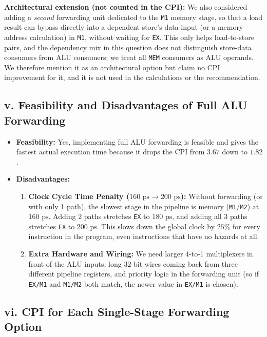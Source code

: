 \documentclass[11pt, a4paper]{article}
\begin{document}
\vspace{6pt}
\textbf{Architectural extension (not counted in the CPI):} We also considered adding a \emph{second} forwarding unit dedicated to the \texttt{M1} memory stage, so that a load result can bypass directly into a dependent store's data input (or a memory-address calculation) in \texttt{M1}, without waiting for \texttt{EX}. This only helps load-to-store pairs, and the dependency mix in this question does not distinguish store-data consumers from ALU consumers; we treat all \texttt{MEM} consumers as ALU operands. We therefore mention it as an architectural option but claim no CPI improvement for it, and it is not used in the calculations or the recommendation.

\subsection*{v. Feasibility and Disadvantages of Full ALU Forwarding}

\begin{itemize}[noitemsep, topsep=2pt]
    \item \textbf{Feasibility:} Yes, implementing full ALU forwarding is feasible and gives the fastest actual execution time because it drops the CPI from $3.67$ down to $1.82$.
    \item \textbf{Disadvantages:}
        \begin{enumerate}[noitemsep, topsep=1pt]
            \item \textbf{Clock Cycle Time Penalty ($160\text{ ps} \rightarrow 200\text{ ps}$):} Without forwarding (or with only 1 path), the slowest stage in the pipeline is memory (\texttt{M1}/\texttt{M2}) at $160\text{ ps}$. Adding 2 paths stretches \texttt{EX} to $180\text{ ps}$, and adding all 3 paths stretches \texttt{EX} to $200\text{ ps}$. This slows down the global clock by $25\%$ for every instruction in the program, even instructions that have no hazards at all.
            \item \textbf{Extra Hardware and Wiring:} We need larger 4-to-1 multiplexers in front of the ALU inputs, long 32-bit wires coming back from three different pipeline registers, and priority logic in the forwarding unit (so if \texttt{EX/M1} and \texttt{M1/M2} both match, the newer value in \texttt{EX/M1} is chosen).
        \end{enumerate}
\end{itemize}

\subsection*{vi. CPI for Each Single-Stage Forwarding Option}
\end{document}
